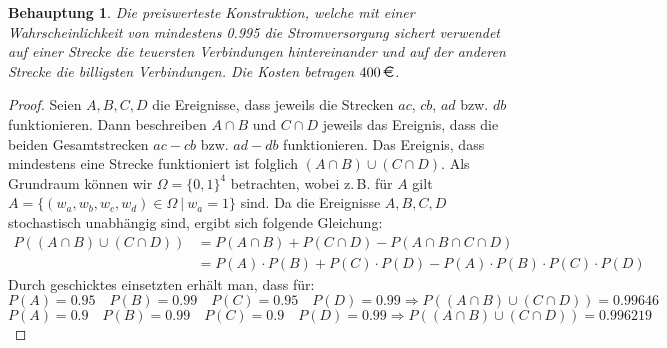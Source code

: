 \documentclass[a4paper]{scrartcl}
\newtheorem*{behaupt}{Behauptung}
\begin{document}
\begin{enumerate}[label=\bfseries\arabic*.]
                \begin{behaupt}
                    Die preiswerteste Konstruktion, welche mit einer
                    Wahrscheinlichkeit von mindestens \num{0.995} die
                    Stromversorgung sichert verwendet auf einer Strecke die
                    teuersten Verbindungen hintereinander und auf der anderen
                    Strecke die billigsten Verbindungen.
                    Die Kosten betragen $400\,\text{\EUR}$.
                \end{behaupt}
                \begin{proof}
                    Seien $A, B, C, D$ die Ereignisse, dass jeweils die Strecken
                    $ac$, $cb$, $ad$ bzw. $db$ funktionieren.
                    Dann beschreiben $A\cap B$ und $C\cap D$ jeweils das
                    Ereignis, dass die beiden Gesamtstrecken $ac-cb$ bzw.
                    $ad-db$ funktionieren.
                    Das Ereignis, dass mindestens eine Strecke
                    funktioniert ist folglich $(A \cap B)\cup (C\cap D)$.
                    Als Grundraum können wir $\Omega = \{0, 1\}^4$ betrachten,
                    wobei z.\,B. für $A$ gilt
                    $A = \{(w_a, w_b, w_c, w_d) \in \Omega \ |\ w_a = 1\}$ sind.
                    Da die Ereignisse $A, B, C, D$ stochastisch unabhängig sind,
                    ergibt sich folgende Gleichung:
                    \begin{equation*}
                        \begin{split}
                            P((A \cap B) \cup (C \cap D))
                            &= P(A \cap B) + P(C \cap D)
                               - P(A \cap B \cap C \cap D) \\
                            &= P(A) \cdot P(B) + P(C) \cdot P(D)
                               - P(A) \cdot P(B) \cdot P(C) \cdot P(D)
                        \end{split}
                    \end{equation*}
                    Durch geschicktes einsetzten erhält man, dass für:\\
                    $P(A)=0.95\quad P(B)=0.99 \quad P(C)=0.95 \quad P(D)=0.99 \Rightarrow
                    P((A\cap B)\cup (C\cap D))=0.99646$\\
                    $P(A)=0.9\quad P(B)=0.99 \quad P(C)=0.9 \quad P(D)=0.99 \Rightarrow
                    P((A\cap B)\cup (C\cap D))=0.996219$\\
                    

\end{proof}
\end{enumerate}
\end{document}
